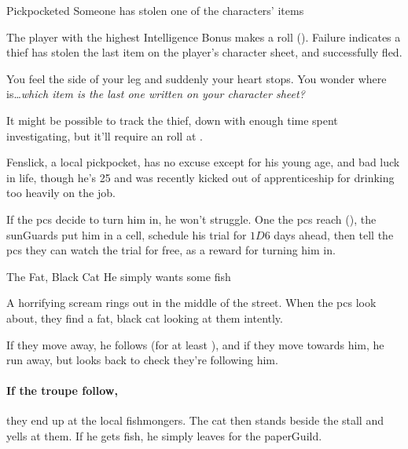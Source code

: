 \label{randommeetings}

{Pickpocketed}%
{Someone has stolen one of the characters' items}%

The player with the highest Intelligence Bonus makes a  roll (\tn[9]).
Failure indicates a thief has stolen the last item on the player's character sheet, and successfully fled.

\begin{boxtext}

  You feel the side of your leg and suddenly your heart stops.
  You wonder where is\ldots \textit{which item is the last one written on your character sheet?}

\end{boxtext}

It might be possible to track the thief, down with enough time spent investigating, but it'll require an  roll at \tn[13].

Fenslick, a local pickpocket, has no excuse except for his young age, and bad luck in life, though he's 25 and was recently kicked out of  apprenticeship for drinking too heavily on the job.

If the \glspl{pc} decide to turn him in, he won't struggle.
One the \glspl{pc} reach  (), the \glspl{sunGuard} put him in a cell, schedule his trial for $1D6$ days ahead, then tell the \glspl{pc} they can watch the trial for free, as a reward for turning him in.


{The Fat, Black Cat}%
{He simply wants some fish}%

A horrifying scream rings out in the middle of the street.
When the \glspl{pc} look about, they find a fat, black cat looking at them intently.

If they move away, he follows (for at least ), and if they move towards him, he run away, but looks back to check they're following him.

\paragraph{If the troupe follow,}
they end up at the local fishmongers.
The cat then stands beside the stall and yells at them.
If he gets fish, he simply leaves for the \gls{paperGuild}.

